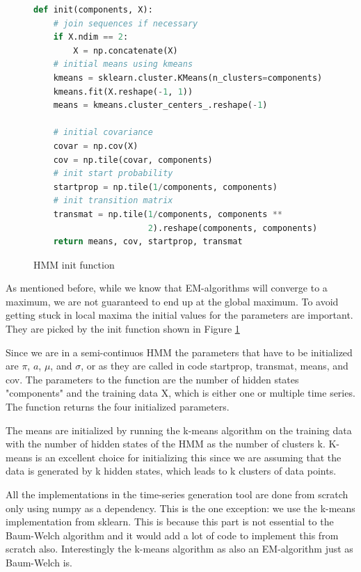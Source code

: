 \begin{figure}
\begin{singlespace}
\begin{lstlisting}[language=Python]
def init(components, X):
    # join sequences if necessary
    if X.ndim == 2:
        X = np.concatenate(X)
    # initial means using kmeans
    kmeans = sklearn.cluster.KMeans(n_clusters=components)
    kmeans.fit(X.reshape(-1, 1))
    means = kmeans.cluster_centers_.reshape(-1)

    # initial covariance
    covar = np.cov(X)
    cov = np.tile(covar, components)
    # init start probability
    startprop = np.tile(1/components, components)
    # init transition matrix
    transmat = np.tile(1/components, components **
                       2).reshape(components, components)
    return means, cov, startprop, transmat
\end{lstlisting}
\end{singlespace}
   
\caption{HMM init function}    
\label{fig:hmm-init-listing}
\end{figure}

As mentioned before, while we know that EM-algorithms will converge to a maximum, we are not guaranteed to end up at the global maximum. To avoid getting stuck in local maxima the initial values for the parameters are important. They are picked by the init function shown in Figure \ref{fig:hmm-init-listing}

Since we are in a semi-continuos HMM the parameters that have to be initialized are $\pi$, $a$, $\mu$, and $\sigma$, or as they are called in code startprop, transmat, means, and cov. The parameters to the function are the number of hidden states "components" and the training data X, which is either one or multiple time series. The function returns the four initialized parameters. 

The means are initialized by running the k-means algorithm on the training data with the number of hidden states of the HMM as the number of clusters k. K-means is an excellent choice for initializing this since we are assuming that the data is generated by k hidden states, which leads to k clusters of data points. 

All the implementations in the time-series generation tool are done from scratch only using numpy as a dependency. This is the one exception: we use the k-means implementation from sklearn. This is because this part is not essential to the Baum-Welch algorithm and it would add a lot of code to implement this from scratch also. Interestingly the k-means algorithm as also an EM-algorithm just as Baum-Welch is. 

